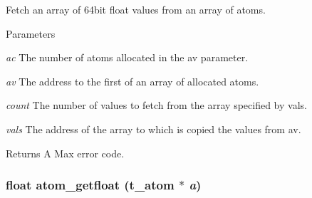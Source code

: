 Fetch an array of 64bit float values from an array of atoms. 
\begin{DoxyParams}{Parameters}
\item[{\em ac}]The number of atoms allocated in the av parameter. \item[{\em av}]The address to the first of an array of allocated atoms. \item[{\em count}]The number of values to fetch from the array specified by vals. \item[{\em vals}]The address of the array to which is copied the values from av. \end{DoxyParams}
\begin{DoxyReturn}{Returns}
A Max error code. 
\end{DoxyReturn}
\hypertarget{group__atom_ga28f52239a67244db2e821320702712ca}{
\subsubsection[{atom\_\-getfloat}]{\setlength{\rightskip}{0pt plus 5cm}float atom\_\-getfloat ({\bf t\_\-atom} $\ast$ {\em a})}}
\label{group__atom_ga28f52239a67244db2e821320702712ca}


